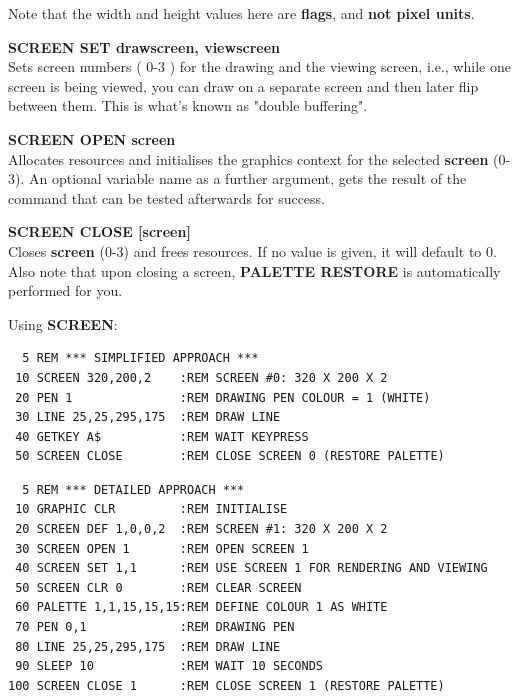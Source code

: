 \begin{description}[leftmargin=2cm,style=nextline]
                Note that the width and height values here are {\bf flags},
                and {\bf not pixel units}.

                {\bf SCREEN SET drawscreen, viewscreen} \\
                Sets screen numbers
                ( 0-3 ) for the drawing and the viewing screen, i.e.,
                while one screen is being viewed, you can draw on a
                separate screen and then later flip between them. This
                is what's known as "double buffering".

                {\bf SCREEN OPEN screen} \\
                Allocates resources and
                initialises the graphics context for the selected
                {\bf screen} (0-3).  An optional variable name as
                a further argument, gets the result of the
                command that can be tested afterwards for success.

                {\bf SCREEN CLOSE [screen] } \\
                Closes {\bf screen} (0-3) and frees resources. If no value is given,
                it will default to 0. Also note that upon closing a screen,
                {\bf PALETTE RESTORE} is automatically performed for you.

\item [Examples:] Using {\bf SCREEN}:
\begin{tcolorbox}[colback=black,coltext=white]
\verbatimfont{\codefont}
\begin{verbatim}
  5 REM *** SIMPLIFIED APPROACH ***
 10 SCREEN 320,200,2    :REM SCREEN #0: 320 X 200 X 2
 20 PEN 1               :REM DRAWING PEN COLOUR = 1 (WHITE)
 30 LINE 25,25,295,175  :REM DRAW LINE
 40 GETKEY A$           :REM WAIT KEYPRESS
 50 SCREEN CLOSE        :REM CLOSE SCREEN 0 (RESTORE PALETTE)
\end{verbatim}
\end{tcolorbox}
\begin{tcolorbox}[colback=black,coltext=white]

\verbatimfont{\codefont}
\begin{verbatim}
  5 REM *** DETAILED APPROACH ***
 10 GRAPHIC CLR         :REM INITIALISE
 20 SCREEN DEF 1,0,0,2  :REM SCREEN #1: 320 X 200 X 2
 30 SCREEN OPEN 1       :REM OPEN SCREEN 1
 40 SCREEN SET 1,1      :REM USE SCREEN 1 FOR RENDERING AND VIEWING
 50 SCREEN CLR 0        :REM CLEAR SCREEN
 60 PALETTE 1,1,15,15,15:REM DEFINE COLOUR 1 AS WHITE
 70 PEN 0,1             :REM DRAWING PEN
 80 LINE 25,25,295,175  :REM DRAW LINE
 90 SLEEP 10            :REM WAIT 10 SECONDS
100 SCREEN CLOSE 1      :REM CLOSE SCREEN 1 (RESTORE PALETTE)
\end{verbatim}
\end{tcolorbox}
\end{description}

